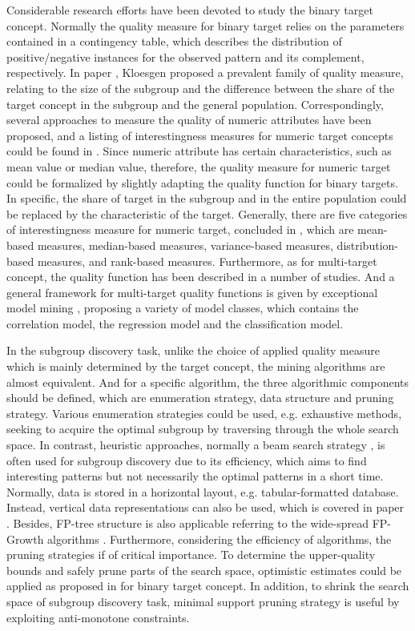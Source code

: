 Considerable research efforts have been devoted to study the binary target concept. Normally the quality measure for binary target relies on the parameters contained in a contingency table, which describes the distribution of positive/negative instances for the observed pattern and its complement, respectively. In paper \cite{klosgen1996explora}, Kloesgen proposed a prevalent family of quality measure, relating to the size of the subgroup and the difference between the share of the target concept in the subgroup and the general population. Correspondingly, several approaches to measure the quality of numeric attributes have been proposed, and a listing of interestingness measures for numeric target concepts could be found in \cite{pieters2010subgroup}. Since numeric attribute has certain characteristics, such as mean value or median value, therefore, the quality measure for numeric target could be formalized by slightly adapting the quality function for binary targets. In specific, the share of target in the subgroup and in the entire population could be replaced by the characteristic of the target. Generally, there are five categories of interestingness measure for numeric target, concluded in \cite{lemmerich2014novel}, which are mean-based measures, median-based measures, variance-based measures, distribution-based measures, and rank-based measures. Furthermore, as for multi-target concept, the quality function has been described in a number of studies. And a general framework for multi-target quality functions is given by exceptional model mining \cite{leman2008exceptional}, proposing a variety of model classes, which contains the correlation model, the regression model and the classification model.  

In the subgroup discovery task, unlike the choice of applied quality measure which is mainly determined by the target concept, the mining algorithms are almost equivalent. And for a specific algorithm, the three algorithmic components should be defined, which are enumeration strategy, data structure and pruning strategy. Various enumeration strategies could be used, e.g. exhaustive methods, seeking to acquire the optimal subgroup by traversing through the whole search space. In contrast, heuristic approaches, normally a beam search strategy \cite{clark1989cn2}, is often used for subgroup discovery due to its efficiency, which aims to find interesting patterns but not necessarily the optimal patterns in a short time. Normally, data is stored in a horizontal layout, e.g. tabular-formatted database. Instead, vertical data representations can also be used, which is covered in paper \cite{zaki2000scalable}. Besides, FP-tree structure is also applicable referring to the wide-spread FP-Growth algorithms \cite{han2000mining}. Furthermore, considering the efficiency of algorithms, the pruning strategies if of critical importance. To determine the upper-quality bounds and safely prune parts of the search space, optimistic estimates could be applied as proposed in \cite{wrobel1997algorithm} for binary target concept. In addition, to shrink the search space of subgroup discovery task, minimal support pruning strategy is useful by exploiting anti-monotone constraints.  



